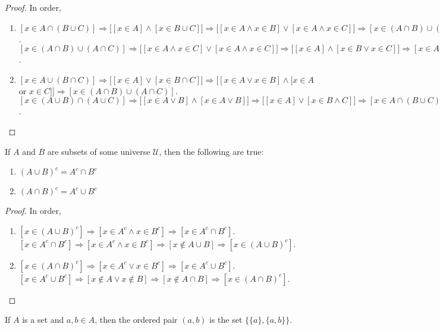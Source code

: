             \begin{proof}
            In order,
            \begin{enumerate}
            \item $[x\in A\cap (B\cup C)]\Rightarrow \big[[x\in A] \land [x\in B\cup C]\big]\Rightarrow \big[[x\in A\land x\in B]\lor [x\in A\land x\in C]\big]\Rightarrow [x\in (A\cap B)\cup (A\cap C)]$. $[x\in (A\cap B)\cup(A\cap C)]\Rightarrow \big[[x\in A\land x\in C]\lor [x\in A \land x\in C]\big]\Rightarrow \big[[x\in A]\land [x\in B\lor x\in C]\big]\Rightarrow [x\in A\cap(B\cup C)]$.
            \item $[x\in A\cup (B\cap C)]\Rightarrow \big[[x\in A]\lor [x\in B\cap C]\big] \Rightarrow \big[[x\in A \lor x\in B]\land [x\in A$ or $x\in C]\big]\Rightarrow [x\in (A\cap B)\cup (A\cap C)]$. $[x\in (A\cup B)\cap (A\cup C)]\Rightarrow \big[[x\in A\lor B]\land [x\in A\lor B]\big]\Rightarrow \big[[x\in A]\lor[x\in B\land C]\big]\Rightarrow [x\in A\cap(B\cup C)]$.
            \end{enumerate}
            \end{proof}
            \begin{theorem}
            If $A$ and $B$ are subsets of some universe $\mathcal{U}$, then the following are true:
            \begin{enumerate}
            \item $(A\cup B)^c = A^c \cap B^c$
            \item $(A\cap B)^c = A^c \cup B^c$
            \end{enumerate}
            \end{theorem}
            \begin{proof}
            In order,
            \begin{enumerate}
            \item $[x\in (A\cup B)^c]\Rightarrow [x\in A^c\land x\in B^c]\Rightarrow [x\in A^c\cap B^c]$. $[x\in A^c \cap B^c]\Rightarrow [x\in A^c\land x\in B^c]\Rightarrow [x\notin A\cup B]\Rightarrow [x\in (A\cup B)^c]$.
            \item $[x\in (A\cap B)^c]\Rightarrow [x\in A^c\lor x\in B^c]\Rightarrow [x\in A^c \cup B^c]$. $[x\in A^c \cup B^c]\Rightarrow [x\notin A\lor x\notin B]\Rightarrow [x\notin A\cap B]\Rightarrow [x\in (A\cap B)^c]$.
            \end{enumerate}
            \end{proof}
            \begin{definition}
            If $A$ is a set and $a,b\in A$, then the ordered pair $(a,b)$ is the set $\{\{a\},\{a,b\}\}$.
            \end{definition}
